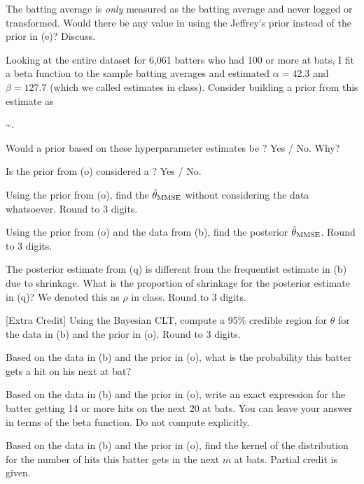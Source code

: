 \documentclass[12pt]{article}
\begin{document}
 The batting average is \textit{only} measured as the batting average and never logged or transformed. Would there be any value in using the Jeffrey's prior instead of the prior in (e)? Discuss. 


 Looking at the entire dataset for 6,061 batters who had 100 or more at bats, I fit a beta function to the sample batting averages and estimated $\alpha = 42.3$ and $\beta = 127.7$ (which we called  estimates in class). Consider building a prior from this estimate as

\beqn
\theta \sim {}.
\eeqn

Would a prior based on these hyperparameter estimates be ? Yes / No. Why? 

 Is the prior from (o) considered a ? Yes / No.

 Using the prior from (o), find the $\hat{\theta}_{\mathrm{MMSE}}$ without considering the data whatsoever. Round to 3 digits. 

 Using the prior from (o) and the data from (b), find the posterior $\hat{\theta}_{\mathrm{MMSE}}$. Round to 3 digits. 

 The posterior estimate from (q) is different from the frequentist estimate in (b) due to shrinkage. What is the proportion of shrinkage for the posterior estimate in (q)? We denoted this as $\rho$ in class. Round to 3 digits. 

 [Extra Credit] Using the Bayesian CLT, compute a 95\% credible region for $\theta$ for the data in (b) and the prior in (o). Round to 3 digits. 

 Based on the data in (b) and the prior in (o), what is the probability this batter gets a hit on his next at bat? 

 Based on the data in (b) and the prior in (o), write an exact expression for the batter getting 14 or more hits on the next 20 at bats. You can leave your answer in terms of the beta function. Do not compute explicitly. 

 Based on the data in (b) and the prior in (o), find the kernel of the distribution for the number of hits this batter gets in the next $m$ at bats. Partial credit is given. 
\end{document}
